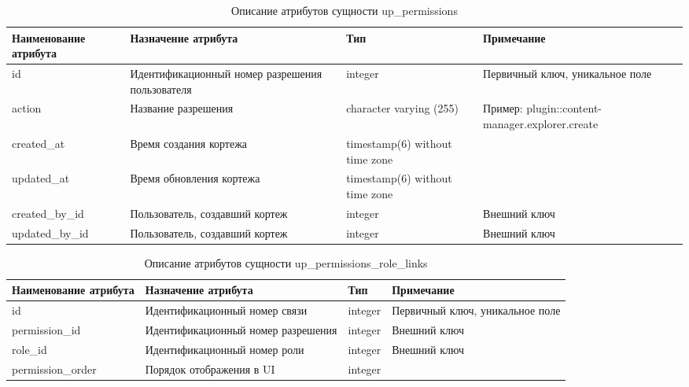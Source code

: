 \documentclass{mirea}
\begin{document}
	\begin{longtable}{ |p{}|p{}|p{}|p{}| } 
		\caption{Описание атрибутов сущности up\_permissions}
		\endfirsthead
		\endhead
		\hline
		Наименование атрибута & Назначение атрибута & Тип & Примечание \\ \hline
		
		id & Идентификацион\-ный номер разрешения пользователя & integer & Первичный ключ, уникальное поле \\ \hline
		
		action & Название разрешения & character varying (255) & Пример: plugin::content-manager.explorer.\-create \\ \hline
		
		created\_at & Время создания кортежа & timestamp(6) without time zone & \\ \hline
		
		updated\_at & Время обновления кортежа & timestamp(6) without time zone & \\ \hline
		
		created\_by\_id & Пользователь, создавший кортеж & integer & Внешний ключ \\ \hline
		
		updated\_by\_id & Пользователь, создавший кортеж & integer & Внешний ключ \\ \hline
		
	\end{longtable}

	\begin{longtable}{ |p{}|p{}|p{}|p{}| } 
		\caption{Описание атрибутов сущности up\_permissions\_role\_links}
		\endfirsthead
		\endhead
		\hline
		Наименование атрибута & Назначение атрибута & Тип & Примечание \\ \hline
		
		id & Идентификацион\-ный номер связи & integer & Первичный ключ, уникальное поле \\ \hline
		
		permission\_id & Идентификацион\-ный номер разрешения & integer & Внешний ключ \\ \hline
		
		role\_id & Идентификацион\-ный номер роли & integer & Внешний ключ \\ \hline
		
		permission\_order & Порядок отображения в UI & integer & \\ \hline
		
	\end{longtable}
\end{document}
